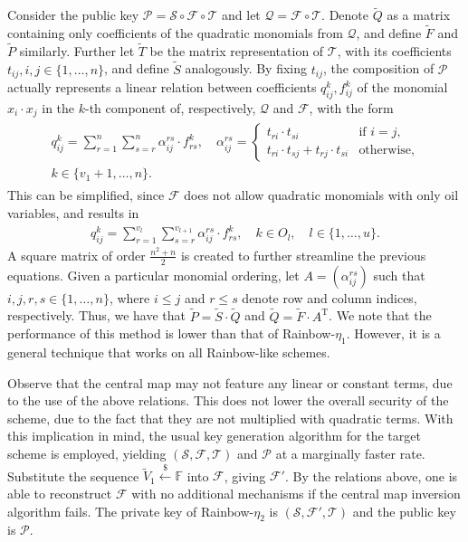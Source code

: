 \documentclass[openright]{report}
\newcommand{\random}{\stackrel{\$}{\longleftarrow}}
\begin{document}
Consider the public key
$\mathcal{P} = \mathcal{S} \circ \mathcal{F} \circ \mathcal{T}$ and let
$\mathcal{Q} = \mathcal{F} \circ \mathcal{T}$. Denote $\widetilde{Q}$ as a
matrix containing only coefficients of the quadratic monomials from
$\mathcal{Q}$, and define $\widetilde{F}$ and $\widetilde{P}$ similarly.
Further let $\widetilde{T}$ be the matrix representation of $\mathcal{T}$, with
its coefficients $t_{ij}, i, j \in \{1, \dots, n\}$, and define $\widetilde{S}$
analogously. By fixing $t_{ij}$, the composition of $\mathcal{P}$ actually
represents a linear relation between coefficients $q_{ij}^{k}, f_{ij}^{k}$ of
the monomial $x_{i} \cdot x_{j}$ in the $k$-th component of, respectively,
$\mathcal{Q}$ and $\mathcal{F}$, with the form
\begin{align}
  \begin{split}
    q_{ij}^{k} = \sum_{r = 1}^{n} \sum_{s = r}^{n}
      \alpha_{ij}^{rs} \cdot f_{rs}^{k}, \quad
      \alpha_{ij}^{rs} = \begin{cases}
        t_{ri} \cdot t_{si}                         & \text{if } i = j, \\
        t_{ri} \cdot t_{sj} + t_{rj} \cdot t_{si}   & \text{otherwise},
      \end{cases} \\
      k \in \{v_{1} + 1, \dots, n\}.
  \end{split}
\end{align}
This can be simplified, since $\mathcal{F}$ does not allow quadratic monomials
with only oil variables, and results in
\begin{align}
  q_{ij}^{k} = \sum_{r = 1}^{v_{l}} \sum_{s = r}^{v_{l + 1}}
    \alpha_{ij}^{rs} \cdot f_{rs}^{k},
      \quad k \in O_{l}, \quad l \in \{1, \dots, u\}.
\end{align}
A square matrix of order $\frac{n^{2} + n}{2}$ is created to further streamline
the previous equations. Given a particular monomial ordering, let
$A = (\alpha_{ij}^{rs})$ such that $i, j, r, s \in \{1, \dots, n\}$, where
$i \leq j$ and $r \leq s$ denote row and column indices, respectively. Thus, we
have that $\widetilde{P} = \widetilde{S} \cdot \widetilde{Q}$ and
$\widetilde{Q} = \widetilde{F} \cdot A^{\text{T}}$. We note that the
performance of this method is lower than that of Rainbow-$\eta_{1}$. However,
it is a general technique that works on all Rainbow-like schemes.

Observe that the central map may not feature any linear or constant terms, due
to the use of the above relations. This does not lower the overall security of
the scheme, due to the fact that they are not multiplied with quadratic terms.
With this implication in mind, the usual key generation algorithm for the
target scheme is employed, yielding $(\mathcal{S}, \mathcal{F}, \mathcal{T})$
and $\mathcal{P}$ at a marginally faster rate. Substitute the sequence
$\widetilde{V}_{1} \random{} \mathbb{F}$ into $\mathcal{F}$, giving
$\mathcal{F'}$. By the relations above, one is able to reconstruct
$\mathcal{F}$ with no additional mechanisms if the central map inversion
algorithm fails. The private key of Rainbow-$\eta_{2}$ is
$(\mathcal{S}, \mathcal{F}', \mathcal{T})$ and the public key is $\mathcal{P}$.
\end{document}
